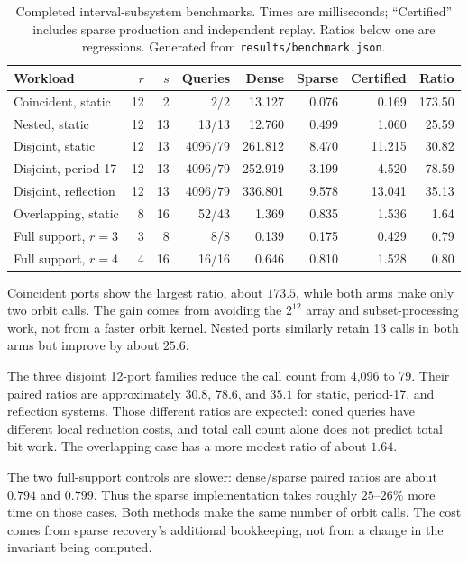 \documentclass[11pt,letterpaper]{article}
\theoremstyle{definition}
\newcommand{\code}[1]{\texttt{#1}}
\begin{document}
\begin{table}[htbp]
\centering
\small
\setlength{\tabcolsep}{3.2pt}
\begin{tabular}{@{}lrrrrrrr@{}}
\toprule
Workload & $r$ & $s$ & Queries & Dense & Sparse & Certified & Ratio\\
\midrule
Coincident, static & 12 & 2 & 2/2 & 13.127 & 0.076 & 0.169 & 173.50 \\
Nested, static & 12 & 13 & 13/13 & 12.760 & 0.499 & 1.060 & 25.59 \\
Disjoint, static & 12 & 13 & 4096/79 & 261.812 & 8.470 & 11.215 & 30.82 \\
Disjoint, period 17 & 12 & 13 & 4096/79 & 252.919 & 3.199 & 4.520 & 78.59 \\
Disjoint, reflection & 12 & 13 & 4096/79 & 336.801 & 9.578 & 13.041 & 35.13 \\
Overlapping, static & 8 & 16 & 52/43 & 1.369 & 0.835 & 1.536 & 1.64 \\
Full support, $r=3$ & 3 & 8 & 8/8 & 0.139 & 0.175 & 0.429 & 0.79 \\
Full support, $r=4$ & 4 & 16 & 16/16 & 0.646 & 0.810 & 1.528 & 0.80 \\
\bottomrule
\end{tabular}
\caption{Completed interval-subsystem benchmarks. Times are milliseconds;
``Certified'' includes sparse production and independent replay. Ratios
below one are regressions. Generated from \code{results/benchmark.json}.}
\label{tab:paired}
\end{table}

Coincident ports show the largest ratio, about $173.5$, while both arms make
only two orbit calls. The gain comes from avoiding the $2^{12}$ array and
subset-processing work, not from a faster orbit kernel. Nested ports
similarly retain 13 calls in both arms but improve by about $25.6$.

The three disjoint 12-port families reduce the call count from 4,096 to 79.
Their paired ratios are approximately $30.8$, $78.6$, and $35.1$ for static,
period-17, and reflection systems. Those different ratios are expected:
coned queries have different local reduction costs, and total call count
alone does not predict total bit work. The overlapping case has a more
modest ratio of about $1.64$.

The two full-support controls are slower: dense/sparse paired ratios are
about $0.794$ and $0.799$. Thus the sparse implementation takes roughly
$25$--$26\%$ more time on those cases. Both methods make the same number of
orbit calls. The cost comes from sparse recovery's additional bookkeeping,
not from a change in the invariant being computed.
\end{document}
